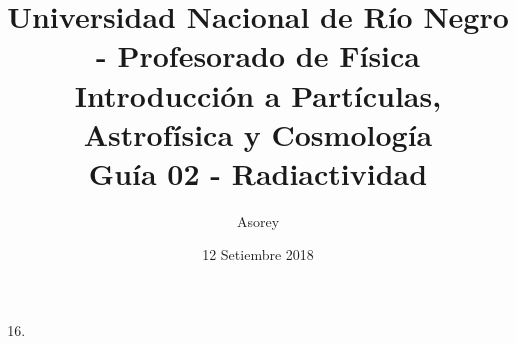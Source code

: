 \documentclass[a4paper,12pt]{article}
\begin{document}
\title{
{\normalsize{Universidad Nacional de Río Negro - Profesorado de Física}}\\
Introducción a Partículas, Astrofísica y Cosmología \\ Guía 02 - Radiactividad\\}
\author{Asorey}
\date{12 Setiembre 2018}
\maketitle

\begin{enumerate}
	\setcounter{enumi}{15}      %
	\item 

\end{enumerate}
\end{document}
